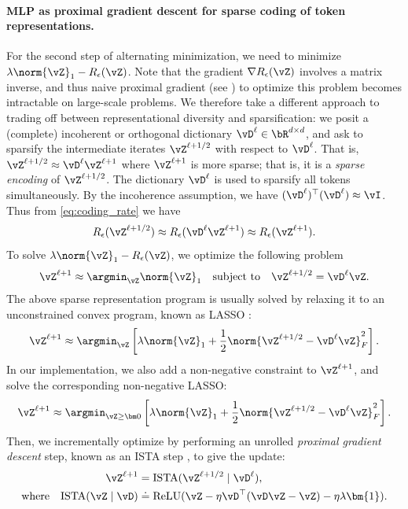 \documentclass[../../book-main.tex]{subfiles}
\begin{document}
\paragraph{MLP as proximal gradient descent for sparse coding of
token representations.} For the second step of alternating
minimization, we need to minimize $\lambda \norm{\vZ}_{1} -
R_{\epsilon}(\vZ)$. Note that the gradient \(\nabla
R_{\epsilon}(\vZ)\) involves a matrix inverse, and thus naive
proximal gradient (see ) to optimize this problem
becomes intractable on large-scale problems. %
We therefore take a different approach to trading off
between representational diversity and sparsification: we posit a
(complete) incoherent or orthogonal dictionary $\vD^{\ell} \in \bR^{d
\times d}$, and ask to sparsify the intermediate iterates $\vZ^{\ell
+ 1/2}$ with respect to \(\vD^{\ell}\). That is, $\vZ^{\ell + 1/2}
\approx \vD^{\ell} \vZ^{\ell + 1}$ where $\vZ^{\ell + 1}$ is more
sparse; that is, it is a \textit{sparse encoding} of \(\vZ^{\ell +
1/2}\). The dictionary \(\vD^{\ell}\) is used to sparsify all tokens
simultaneously.
By the incoherence assumption, we have $(\vD^{\ell})^\top(\vD^{\ell})
\approx \vI$. Thus from \eqref{eq:coding_rate} we have
\begin{equation}
    R_{\epsilon}(\vZ^{\ell + 1/2}) \approx
    R_{\epsilon}(\vD^{\ell}\vZ^{\ell + 1}) \approx R_{\epsilon}(\vZ^{\ell + 1}).
\end{equation}
To solve $\lambda \norm{\vZ}_{1} - R_{\epsilon}(\vZ)$, we optimize
the following problem
\begin{align*}
    \vZ^{\ell + 1} \approx \argmin_{\vZ}  \norm{\vZ}_1 \quad
    \mbox{subject to} \quad \vZ^{\ell + 1/2} = \vD^{\ell}\vZ.
\end{align*}
{The above sparse representation program is usually solved by
    relaxing it to an unconstrained convex program, known as LASSO
\citep{Wright-Ma-2022}:}
\begin{equation}
    \vZ^{\ell + 1} \approx \argmin_{\vZ} \left[\lambda \norm{\vZ}_1 +
    \frac{1}{2}\norm{\vZ^{\ell + 1/2} - \vD^{\ell} \vZ}_F^2 \right].
\end{equation}
In our implementation, we also add a non-negative constraint to
$\vZ^{\ell + 1}$, and solve the corresponding non-negative LASSO:
\begin{equation}
    \vZ^{\ell + 1} \approx \argmin_{\vZ \geq \bm 0}
    \left[\lambda\norm{\vZ}_1 + \frac{1}{2}\norm{\vZ^{\ell + 1/2} -
    \vD^{\ell} \vZ}_{F}^{2}\right].
    \label{eq:sparse-nonnegative}
\end{equation}
Then, we incrementally optimize  by
performing an unrolled {\em proximal gradient descent} step, known as
an ISTA step \citep{beck2009fast}, to give the update:
\begin{align}\label{eq:ista-block}
    \vZ^{\ell + 1}
    &= \mathrm{ISTA}({\vZ^{\ell + 1/2} \mid \vD^{\ell}}), \\
    \text{where} \quad \mathrm{ISTA}({\vZ \mid \vD})
    &\doteq \operatorname{ReLU}(\vZ - \eta \vD^\top(\vD\vZ - \vZ) -
    \eta \lambda \bm{1}).
\end{align}
\end{document}
